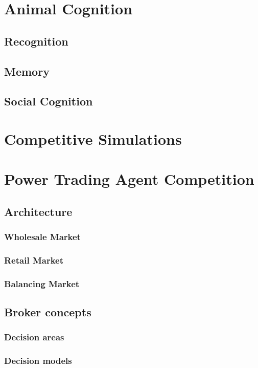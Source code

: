 \chapter{Animal Cognition}
\section{Recognition}
\section{Memory}
\section{Social Cognition}

\chapter{Competitive Simulations}%

\chapter{Power Trading Agent Competition}
\section{Architecture}
\subsection{Wholesale Market}
\subsection{Retail Market}
\subsection{Balancing Market}

\section{Broker concepts}
\subsection{Decision areas}
\subsection{Decision models}
